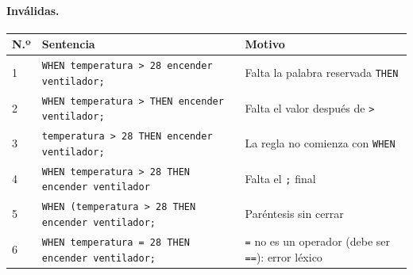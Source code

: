 \paragraph{Inválidas.}
\begin{center}\small
\begin{tabular}{@{}l >{\raggedright\arraybackslash}p{7.2cm} >{\raggedright\arraybackslash}p{6.3cm}@{}}
\toprule
\textbf{N.º} & \textbf{Sentencia} & \textbf{Motivo} \\
\midrule
1 & \texttt{WHEN temperatura > 28 encender ventilador;} & Falta la palabra reservada \texttt{THEN} \\
2 & \texttt{WHEN temperatura > THEN encender ventilador;} & Falta el valor después de \texttt{>} \\
3 & \texttt{temperatura > 28 THEN encender ventilador;} & La regla no comienza con \texttt{WHEN} \\
4 & \texttt{WHEN temperatura > 28 THEN encender ventilador} & Falta el \texttt{;} final \\
5 & \texttt{WHEN (temperatura > 28 THEN encender ventilador;} & Paréntesis sin cerrar \\
6 & \texttt{WHEN temperatura = 28 THEN encender ventilador;} & \texttt{=} no es un operador (debe ser \texttt{==}): error léxico \\
\bottomrule
\end{tabular}
\end{center}

